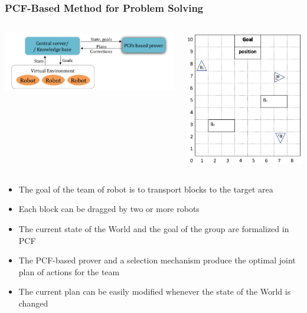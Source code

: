 \documentclass[10pt]{beamer}
\begin{document}
\begin{frame}[fragile]
  \frametitle{PCF-Based Method for Problem Solving}
   \begin{columns}
     \begin{column}{0.6\textwidth}
       \includegraphics[width=\linewidth]{pcf-robo-planning.pdf}
     \end{column}
     \begin{column}{0.3\textwidth}
       \includegraphics[width=\linewidth]{pcf-room.png}
     \end{column}
   \end{columns}
   \begin{itemize}
   \item The goal of the team  of robot is to transport blocks to the target area
   \item Each block can be dragged by two or more robots
   \item The current state of the  World and the goal of the group are formalized in PCF
   \item The PCF-based prover and a selection mechanism produce the optimal joint plan of actions for the team
   \item The current plan can be easily modified whenever the state of the World is changed
   \end{itemize}
 \end{frame}
\end{document}
